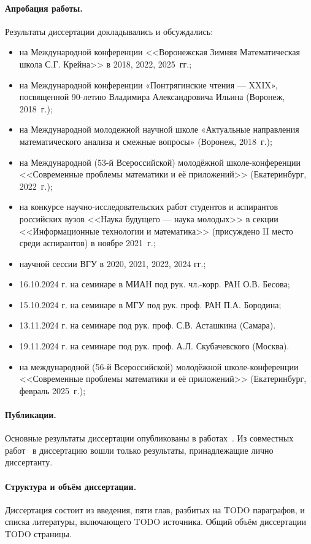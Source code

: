 \paragraph{Апробация работы.}
Результаты диссертации докладывались и обсуждались:
\begin{itemize}
	\item
		на Международной конференции <<Воронежская Зимняя Математическая школа С.Г. Крейна>> в 2018, 2022, 2025~гг.;
	\item
		на Международной конференции «Понтрягинские чтения — XXIX», посвященной 90-летию Владимира Александровича Ильина (Воронеж, 2018~г.);
	\item
		на Международной молодежной научной школе «Актуальные направления математического анализа и смежные вопросы» (Воронеж, 2018~г.);
	\item
		на Международной (53-й Всероссийской) молодёжной школе-конференции
		<<Современные проблемы математики и её приложений>>
		(Екатеринбург, 2022~г.);
	\item
		на конкурсе научно-исследовательских работ студентов и аспирантов российских вузов
		<<Наука будущего --- наука молодых>> в секции <<Информационные технологии и математика>>
		(присуждено II место среди аспирантов) в ноябре 2021~г.;
	\item научной сессии ВГУ в 2020, 2021, 2022, 2024 гг.; %
	\item
		16.10.2024 г. на семинаре в МИАН под рук. чл.-корр. РАН О.В. Бесова;
	\item
		15.10.2024 г. на семинаре в МГУ под рук. проф. РАН П.А. Бородина;
	\item
		13.11.2024 г. на семинаре под рук. проф. С.В. Асташкина (Самара).
	\item
		19.11.2024 г. на семинаре под рук. проф. А.Л. Скубачевского (Москва).
	\item
		на международной (56-й Всероссийской) молодёжной школе-конференции
		<<Современные проблемы математики и её приложений>>
		(Екатеринбург, февраль 2025~г.);
\end{itemize}


\paragraph{Публикации.}
Основные результаты диссертации опубликованы в работах~.
Из совместных работ~
в диссертацию вошли только результаты, принадлежащие лично диссертанту.

\paragraph{Структура и объём диссертации.}
Диссертация состоит из введения, пяти глав, разбитых на TODO параграфов,
и списка литературы, включающего TODO источника.
Общий объём диссертации TODO страницы.
